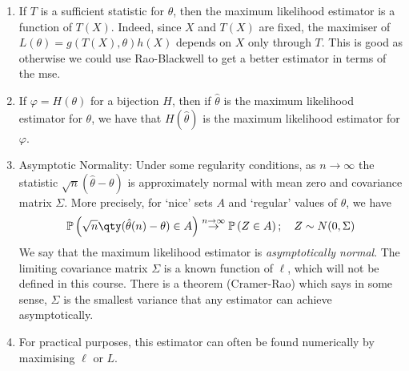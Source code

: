 \begin{remark}
	\begin{enumerate}
		\item If $T$ is a sufficient statistic for $\theta$, then the maximum likelihood estimator is a function of $T(X)$.
		Indeed, since $X$ and $T(X)$ are fixed, the maximiser of $L(\theta) = g(T(X), \theta) h(X)$ depends on $X$ only through $T$.
		This is good as otherwise we could use Rao-Blackwell to get a better estimator in terms of the mse.
		\item If $\varphi = H(\theta)$ for a bijection $H$, then if $\hat \theta$ is the maximum likelihood estimator for $\theta$, we have that $H(\hat \theta)$ is the maximum likelihood estimator for $\varphi$.
		\item Asymptotic Normality: Under some regularity conditions, as $n \to \infty$ the statistic $\sqrt{n} (\hat \theta - \theta)$ is approximately normal with mean zero and covariance matrix $\Sigma$.
		More precisely, for `nice' sets $A$ and `regular' values of $\theta$, we have
		\begin{align*}
			\prob{\sqrt{n} \qty(\hat \theta(n) - \theta) \in A} \overset{n \to \infty}\to \prob{Z \in A};\quad Z \sim N(0, \Sigma)
		\end{align*}
		We say that the maximum likelihood estimator is \textit{asymptotically normal}.
		The limiting covariance matrix $\Sigma$ is a known function of $\ell$, which will not be defined in this course.
		There is a theorem (Cramer-Rao) which says in some sense, $\Sigma$ is the smallest variance that any estimator can achieve asymptotically.
		\item For practical purposes, this estimator can often be found numerically by maximising $\ell$ or $L$.
	\end{enumerate} 
\end{remark}

